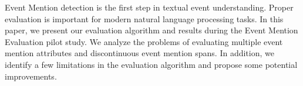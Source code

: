 Event Mention detection is the first step in textual event understanding. Proper evaluation is important for modern natural language processing tasks. In this paper, we present our evaluation algorithm and results during the Event Mention Evaluation pilot study. We analyze the problems of evaluating multiple event mention attributes and discontinuous event mention spans. In addition, we identify a few limitations in the evaluation algorithm and propose some potential improvements.
